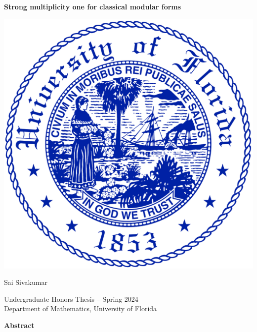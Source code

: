 \documentclass[10pt,leqno,twoside]{article}
\theoremstyle{plain}
\theoremstyle{definition}
\numberwithin{equation}{section}
\numberwithin{lem}{section}
\begin{document}
\begin{titlepage}
    \begin{center}
        \vspace*{4em}
        {\Large\textbf{Strong multiplicity one for classical modular forms}}

        \vspace{12em}
        \includegraphics[scale=0.14]{uf.png}

        \vspace{14em}
        Sai Sivakumar

        Undergraduate Honors Thesis -- Spring 2024\\
        Department of Mathematics, University of Florida
    \end{center}
\end{titlepage}
\begin{center}
    \textbf{Abstract}
\end{center}
\end{document}
